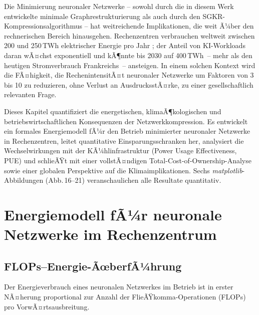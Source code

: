 ﻿\documentclass[12pt, a4paper, openany]{report}
\begin{document}
Die Minimierung neuronaler Netzwerke -- sowohl durch die in diesem Werk
entwickelte minimale Graphrestrukturierung als auch durch den
SGKR-Kompressions\-algorithmus -- hat weitreichende Implikationen, die weit
Ã¼ber den rechnerischen Bereich hinausgehen.  Rechenzentren verbrauchen
weltweit zwischen 200 und 250\,TWh elektrischer Energie pro Jahr
\citep{iea2024}; der Anteil von KI-Workloads daran
wÃ¤chst exponentiell und kÃ¶nnte bis 2030 auf 400\,TWh~-- mehr als den
heutigen Stromverbrauch Frankreichs~-- ansteigen.  In einem solchen Kontext
wird die FÃ¤higkeit, die RechenintensitÃ¤t neuronaler Netzwerke um Faktoren
von 3 bis 10 zu reduzieren, ohne Verlust an AusdrucksstÃ¤rke, zu einer
gesellschaftlich relevanten Frage.

Dieses Kapitel quantifiziert die energetischen, klimaÃ¶kologischen und
betriebswirtschaftlichen Konsequenzen der Netzwerkkompression.  Es entwickelt
ein formales Energiemodell fÃ¼r den Betrieb minimierter neuronaler Netzwerke
in Rechenzentren, leitet quantitative Einsparungsschranken her, analysiert
die Wechselwirkungen mit der KÃ¼hlinfrastruktur (Power Usage Effectiveness,
PUE) und schlieÃŸt mit einer vollstÃ¤ndigen Total-Cost-of-Ownership-Analyse
sowie einer globalen Perspektive auf die Klimaimplikationen.  Sechs
\textit{matplotlib}-Abbildungen (Abb.\,16--21) veranschaulichen alle
Resultate quantitativ.

\section{Energiemodell fÃ¼r neuronale Netzwerke im Rechenzentrum}
\label{sec:energy_model}

\subsection{FLOPs--Energie-ÃœberfÃ¼hrung}

Der Energieverbrauch eines neuronalen Netzwerkes im Betrieb ist in erster
NÃ¤herung proportional zur Anzahl der FlieÃŸkomma-Operationen (FLOPs) pro
VorwÃ¤rtsausbreitung.
\end{document}
